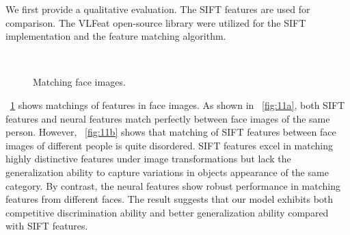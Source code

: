 \documentclass[twocolumn]{article}
\begin{document}
We first provide a qualitative evaluation.
The SIFT features are used for comparison.
The VLFeat open-source library \cite{vedaldi2010} were utilized for the SIFT implementation and the feature matching algorithm.

\begin{figure}
\centering
  \\
\caption{Matching face images.}
\label{fig:11}
\end{figure}

\figurename~\ref{fig:11} shows matchings of features in face images.
As shown in \figurename~\ref{fig:11a}, both SIFT features and neural features match perfectly between face images of the same person.
However, \figurename~\ref{fig:11b} shows that matching of SIFT features between face images of different people is quite disordered.
SIFT features excel in matching highly distinctive features under image transformations
but lack the generalization ability to capture variations in objects appearance of the same category.
By contrast, the neural features show robust performance in matching features from different faces.
The result suggests that our model exhibits both competitive discrimination ability and better generalization ability compared with SIFT features.
\end{document}
